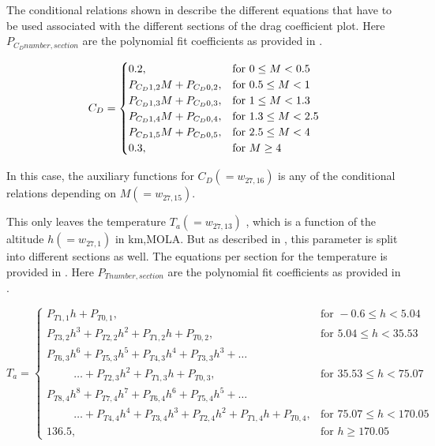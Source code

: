 The conditional relations shown in  describe the different equations that have to be used associated with the different sections of the drag coefficient plot. Here $P_{C_{D} number,section}$ are the polynomial fit coefficients as provided in .

\begin{equation}\label{eq:cdCondC}
C_{D}=\begin{cases}
0.2, & \text{for } 0\leq M < 0.5\\
P_{C_{D} 1,2}M+P_{C_{D} 0,2}, &  \text{for } 0.5\leq M < 1 \\
P_{C_{D} 1,3}M+P_{C_{D} 0,3}, &  \text{for } 1\leq M < 1.3 \\
P_{C_{D} 1,4}M+P_{C_{D} 0,4}, &  \text{for } 1.3\leq M < 2.5 \\
P_{C_{D} 1,5}M+P_{C_{D} 0,5}, &  \text{for } 2.5\leq M < 4 \\
0.3, &  \text{for } M \geq 4 
\end{cases}\\
\end{equation}

In this case, the auxiliary functions for $C_{D} \left( = w_{27,16}\right)$ is any of the conditional relations depending on $M \left( = w_{27,15}\right)$.

This only leaves the temperature $T_{a} \left(= w_{27,13}\right)$ , which is a function of the altitude $h \left(= w_{27,1} \right) $ in km,\ac{MOLA}. But as described in , this parameter is split into different sections as well. The equations per section for the temperature is provided in . Here $P_{T number,section}$ are the polynomial fit coefficients as provided in .

\begin{equation}\label{eq:tempCondAuxC}
T_{a}=\begin{cases}
P_{T 1,1}h+P_{T 0,1}, & \text{for } -0.6 \leq h < 5.04  \\
P_{T 3,2}h^{3}+P_{T 2,2}h^{2}+P_{T 1,2}h+P_{T 0,2}, &  \text{for } 5.04 \leq h < 35.53   \\
P_{T 6,3}h^{6}+P_{T 5,3}h^{5}+P_{T 4,3}h^{4}+P_{T 3,3}h^{3}+ \dotsc \\
\qquad\ \ \dotsc +P_{T 2,3}h^{2}+P_{T 1,3}h+P_{T 0,3}, &  \text{for } 35.53 \leq h < 75.07   \\
P_{T 8,4}h^{8}+P_{T 7,4}h^{7}+P_{T 6,4}h^{6}+P_{T 5,4}h^{5}+ \dotsc \\
\qquad\ \ \dotsc+P_{T 4,4}h^{4}+P_{T 3,4}h^{3}+P_{T 2,4}h^{2}+P_{T 1,4}h+P_{T 0,4}, &  \text{for } 75.07 \leq h < 170.05   \\
136.5, &  \text{for }  h \geq 170.05   
\end{cases}
\end{equation}

